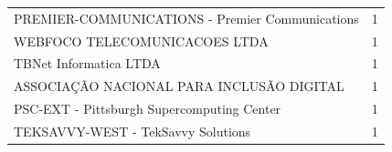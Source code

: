 \begin{table}[!h]
\begin{tabular}{lp{3cm}}
		PREMIER-COMMUNICATIONS - Premier Communications         &                           1  \\
		WEBFOCO TELECOMUNICACOES LTDA                             &                         1  \\
		TBNet Informatica LTDA                                    &                         1  \\
		ASSOCIAÇÃO NACIONAL PARA INCLUSÃO DIGITAL        &                         1  \\
		PSC-EXT - Pittsburgh Supercomputing Center                 &                        1  \\
		TEKSAVVY-WEST - TekSavvy Solutions                            &                     1  \\
  		\bottomrule
\end{tabular}
\end{table}

